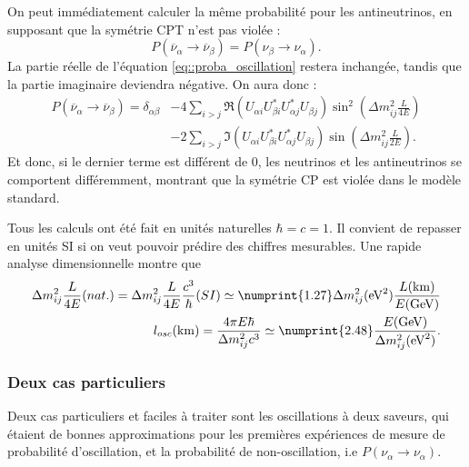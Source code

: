             On peut immédiatement calculer la même probabilité pour les antineutrinos, en supposant que la symétrie CPT n'est pas violée : 
            \begin{equation}
                P(\overline{\nu}_{\alpha}\to\overline{\nu}_{\beta}) = P(\nu_{\beta}\to\nu_{\alpha}).
            \end{equation}
            La partie réelle de l'équation \eqref{eq::proba_oscillation} restera inchangée, tandis que la partie imaginaire deviendra négative. On aura donc :
            \begin{equation}
                \begin{split}
                    P(\overline{\nu}_{\alpha}\to\overline{\nu}_{\beta}) = \delta_{\alpha\beta} & - 4\sum_{i>j}\Re(U_{\alpha i}U_{\beta i}^*U_{\alpha j}^*U_{\beta j})\sin^2\left(\Delta m_{ij}^2\frac{L}{4E}\right) \\
                    & -2\sum_{i>j}\Im(U_{\alpha i}U_{\beta i}^*U_{\alpha j}^*U_{\beta j})\sin\left(\Delta m_{ij}^2\frac{L}{2E}\right).
                \end{split}
            \end{equation}
            Et donc, si le dernier terme est différent de 0, les neutrinos et les antineutrinos se comportent différemment, montrant que la symétrie CP est violée dans le modèle standard.
            
            Tous les calculs ont été fait en unités naturelles $\hbar = c = 1$. Il convient de repasser en unités SI si on veut pouvoir prédire des chiffres mesurables. Une rapide analyse dimensionnelle montre que 
            \begin{eqnarray}
                \Delta m_{ij}^2\frac{L}{4E}(nat.)
                = \Delta m_{ij}^2\frac{L}{4E}\frac{c^3}{\hbar}(SI)
                \simeq \numprint{1.27}\Delta m_{ij}^2(\si{\electronvolt\squared})\frac{L(\si{\kilo\meter})}{E(\si{\giga\electronvolt})} \\ 
                l_{osc}(\si{\kilo\meter}) = \frac{4\pi E\hbar}{\Delta m_{ij}^2c^3} \simeq \numprint{2.48}\frac{E(\si{\giga\electronvolt})}{\Delta m_{ij}^2(\si{\electronvolt\squared})}.
            \end{eqnarray}
            
        \subsubsection{Deux cas particuliers}
            Deux cas particuliers et faciles à traiter sont les oscillations à deux saveurs, qui étaient de bonnes approximations pour les premières expériences de mesure de probabilité d'oscillation, et la probabilité de non-oscillation, i.e $P(\nu_{\alpha}\to\nu_{\alpha})$.
            

